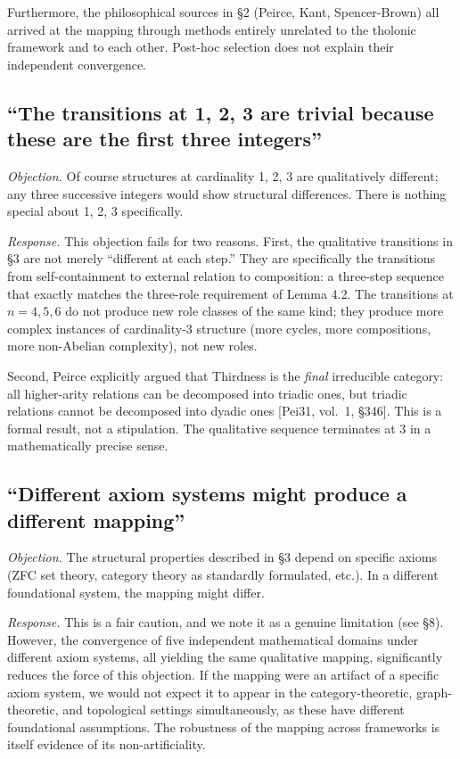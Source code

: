 \documentclass[12pt]{article}
\begin{document}
Furthermore, the philosophical sources in §2 (Peirce, Kant,
Spencer-Brown) all arrived at the mapping through methods entirely
unrelated to the tholonic framework and to each other. Post-hoc
selection does not explain their independent convergence.

\subsection{``The transitions at 1, 2, 3 are trivial because these are the first three integers''}\label{the-transitions-at-1-2-3-are-trivial-because-these-are-the-first-three-integers}

\emph{Objection.} Of course structures at cardinality 1, 2, 3 are
qualitatively different; any three successive integers would show
structural differences. There is nothing special about 1, 2, 3
specifically.

\emph{Response.} This objection fails for two reasons. First, the
qualitative transitions in §3 are not merely ``different at each step.''
They are specifically the transitions from self-containment to external
relation to composition: a three-step sequence that exactly matches the
three-role requirement of Lemma 4.2. The transitions at \(n = 4, 5, 6\)
do not produce new role classes of the same kind; they produce more
complex instances of cardinality-3 structure (more cycles, more
compositions, more non-Abelian complexity), not new roles.

Second, Peirce explicitly argued that Thirdness is the \emph{final}
irreducible category: all higher-arity relations can be decomposed into
triadic ones, but triadic relations cannot be decomposed into dyadic
ones {[}Pei31, vol.~1, §346{]}. This is a formal result, not a
stipulation. The qualitative sequence terminates at 3 in a
mathematically precise sense.

\subsection{``Different axiom systems might produce a different mapping''}\label{different-axiom-systems-might-produce-a-different-mapping}

\emph{Objection.} The structural properties described in §3 depend on
specific axioms (ZFC set theory, category theory as standardly
formulated, etc.). In a different foundational system, the mapping might
differ.

\emph{Response.} This is a fair caution, and we note it as a genuine
limitation (see §8). However, the convergence of five independent
mathematical domains under different axiom systems, all yielding the
same qualitative mapping, significantly reduces the force of this
objection. If the mapping were an artifact of a specific axiom system,
we would not expect it to appear in the category-theoretic,
graph-theoretic, and topological settings simultaneously, as these have
different foundational assumptions. The robustness of the mapping across
frameworks is itself evidence of its non-artificiality.
\end{document}

